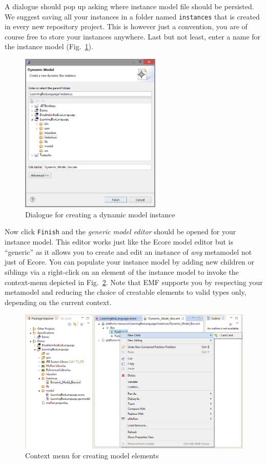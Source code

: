 A dialogue should pop up asking where instance model file should be persisted.
We suggest saving all your instances in a folder named \texttt{instances} that is created in every new repository project.
This is however just a convention, you are of course free to store your instances anywhere.
Last but not least, enter a name for the instance model (Fig.~\ref{fig:store_dynamic_instance}).

\begin{figure}[htbp]
	\centering
  \includegraphics[width=0.6\textwidth]{pics/modelBrowserBilder/persistDialog.png}
	\caption{Dialogue for creating a dynamic model instance}
	\label{fig:store_dynamic_instance}
\end{figure}

Now click \texttt{Finish} and the \emph{generic model editor} should be opened for your instance model.
This editor works just like the Ecore model editor but is ``generic'' as it allows you to create and edit an instance of \emph{any} metamodel not just of Ecore.
You can populate your instance model by adding new children or siblings via a right-click on an element of the instance model to invoke the context-menu depicted in Fig.~\ref{fig:create_instance}.
Note that EMF supports you by respecting your metamodel and reducing the choice of creatable elements to valid types only, depending on the current context.

\begin{figure}[htbp]
	\centering
  \includegraphics[width=\textwidth]{pics/modelBrowserBilder/adjustModel.png}
	\caption{Context menu for creating model elements}
	\label{fig:create_instance}
\end{figure}

